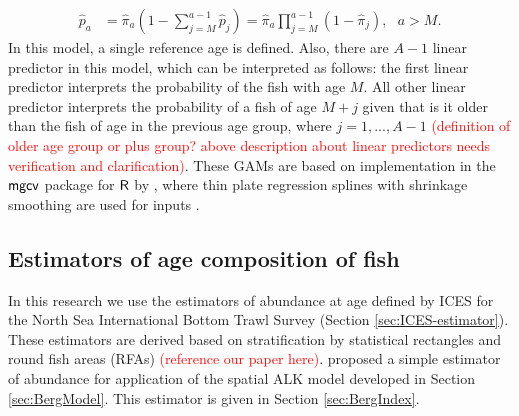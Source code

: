 \documentclass[a4paper 12pt]{article}
\numberwithin{equation}{section}
\newcommand{\mgcv}{\textnormal{\sffamily mgcv}\xspace}
\newcommand{\R}{\textnormal{\sffamily R}\xspace}
\newcommand{\ed}[1]{\textcolor{red}{#1}}
\begin{document}
\begin{align}
\hat{p}_{a} & = \hat{\pi}_{a} \left(1- \sum_{j=M}^{a-1} \hat{p}_{j} \right) = \hat{\pi}_{a} \prod_{j = M}^{a-1}  \left(1- \hat{\pi}_{j}  \right), \ \ \  a > M.
\label{eq:unconditionalBerg2}
\end{align}
In this model, a single reference age is defined. Also, there are $A-1$ linear predictor in this model, which can be interpreted as follows: the first linear predictor interprets the probability of the fish with age $M$. All other linear predictor interprets the probability of a fish of age $M+ j$ given that is it older than the fish of age in the previous age group, where $j=1,...,A-1$ \ed{(definition of older age group or plus group? above description about linear predictors needs verification and clarification)}. These GAMs are based on implementation in the  $\mgcv$ package for $\R$ by \citet{wood2015package}, where  thin plate regression splines with shrinkage smoothing are used for inputs \citep{berg2012spatial}.



\subsection{\large Estimators of age composition of fish}
\label{sec:cpueestimators}

In this research we use the estimators of abundance at age defined by ICES for the North Sea International Bottom Trawl Survey (Section \ref{sec:ICES-estimator}). These estimators are derived based on stratification by statistical rectangles and round fish areas (RFAs) \ed{(reference our paper here)}. \citet{berg2012spatial} proposed a simple estimator of abundance for application of the spatial ALK model developed in Section \ref{sec:BergModel}. This estimator is given in Section \ref{sec:BergIndex}.
\end{document}

